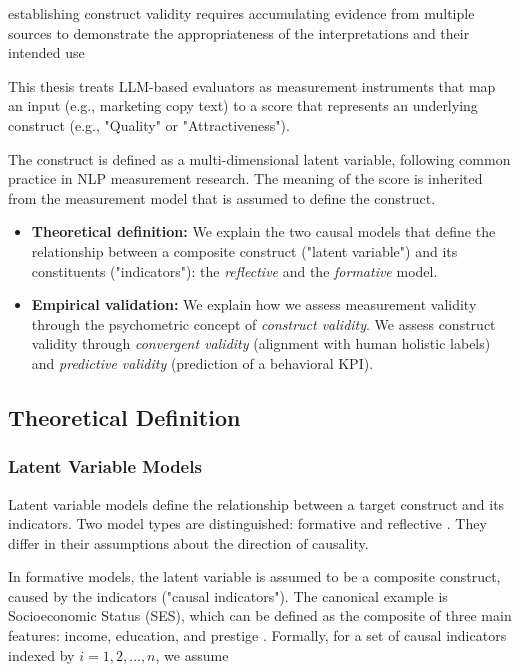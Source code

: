 establishing construct validity requires accumulating evidence from multiple sources to demonstrate the appropriateness of the interpretations and their intended use \citep{messick1989meaning}



This thesis treats LLM-based evaluators as measurement instruments that map an input (e.g., marketing copy text) to a score that represents an underlying construct (e.g., "Quality" or "Attractiveness").


The construct is defined as a multi-dimensional latent variable, following common practice in NLP measurement research. The meaning of the score is inherited from the measurement model that is assumed to define the construct. 


\begin{itemize}
    \item \textbf{Theoretical definition:} We explain the two causal models that define the relationship between a composite construct ("latent variable") and its constituents ("indicators"): the \emph{reflective} and the \emph{formative} model. 
    \item \textbf{Empirical validation:} We explain how we assess measurement validity through the psychometric concept of \textit{construct validity}. We assess construct validity through \textit{convergent validity} (alignment with human holistic labels) and \textit{predictive validity} (prediction of a behavioral KPI). 
\end{itemize}

\subsection{Theoretical Definition}\label{sec:theoretical_definition}

\subsubsection{Latent Variable Models}

Latent variable models define the relationship between a target construct and its indicators. Two model types are distinguished: formative and reflective \citep{bollen1991conventional}. They differ in their assumptions about the direction of causality. 

In formative models, the latent variable is assumed to be a composite construct, caused by the indicators ("causal indicators"). The canonical example is Socioeconomic Status (SES), which can be defined as the composite of three main features: income, education, and prestige \citep{mcquitty2013structural}. Formally, for a set of causal indicators indexed by $i = 1,2, \dots ,n$, we assume

